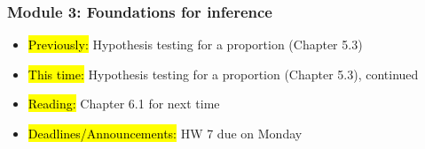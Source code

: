 
\begin{frame}
    \frametitle{Module 3: Foundations for inference}
    \begin{itemize}
        \item \hl{Previously: }Hypothesis testing for a proportion (Chapter 5.3)
        \item \hl{This time: }Hypothesis testing for a proportion (Chapter 5.3), continued
        \item \hl{Reading: }Chapter 6.1 for next time
        \item \hl{Deadlines/Announcements: }HW 7 due on Monday
    \end{itemize}
    
\end{frame}